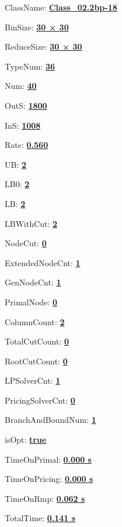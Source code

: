 \documentclass[11pt]{article}
\begin{document}
\pagestyle{empty}


ClassName: \underline{\textbf{Class_02.2bp-18}}
\par
BinSize: \underline{\textbf{30 × 30}}
\par
ReduceSize: \underline{\textbf{30 × 30}}
\par
TypeNum: \underline{\textbf{36}}
\par
Num: \underline{\textbf{40}}
\par
OutS: \underline{\textbf{1800}}
\par
InS: \underline{\textbf{1008}}
\par
Rate: \underline{\textbf{0.560}}
\par
UB: \underline{\textbf{2}}
\par
LB0: \underline{\textbf{2}}
\par
LB: \underline{\textbf{2}}
\par
LBWithCut: \underline{\textbf{2}}
\par
NodeCut: \underline{\textbf{0}}
\par
ExtendedNodeCnt: \underline{\textbf{1}}
\par
GenNodeCnt: \underline{\textbf{1}}
\par
PrimalNode: \underline{\textbf{0}}
\par
ColumnCount: \underline{\textbf{2}}
\par
TotalCutCount: \underline{\textbf{0}}
\par
RootCutCount: \underline{\textbf{0}}
\par
LPSolverCnt: \underline{\textbf{1}}
\par
PricingSolverCnt: \underline{\textbf{0}}
\par
BranchAndBoundNum: \underline{\textbf{1}}
\par
isOpt: \underline{\textbf{true}}
\par
TimeOnPrimal: \underline{\textbf{0.000 s}}
\par
TimeOnPricing: \underline{\textbf{0.000 s}}
\par
TimeOnRmp: \underline{\textbf{0.062 s}}
\par
TotalTime: \underline{\textbf{0.141 s}}
\par
\newpage
\end{document}
